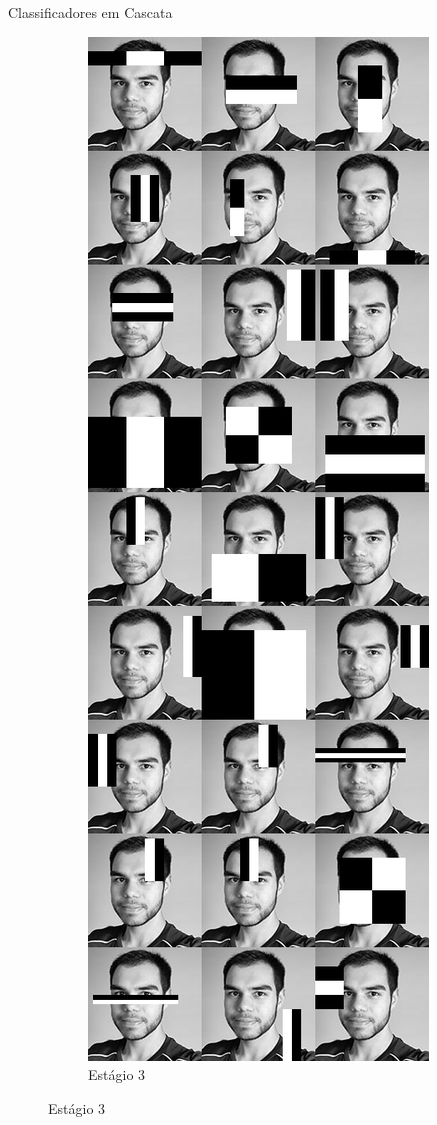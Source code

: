 \begin{frame}{Classificadores em Cascata}
\begin{figure}[htbp]
\begin{subfigure}[t]{0.24\textwidth}
    \centering
    \caption{Estágio 3}
    \includegraphics[height=0.6\textheight,width=\textwidth,keepaspectratio]{imagens/cascata_estagio_03.png}

\end{subfigure}
\end{figure}
\end{frame}
